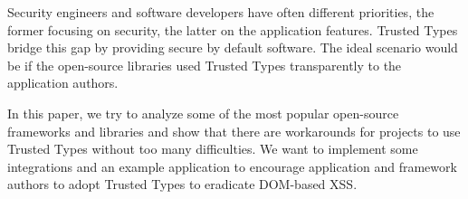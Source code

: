 Security engineers and software developers have often different priorities, the former focusing on
security, the latter on the application features. Trusted Types bridge this gap by providing secure
by default software. The ideal scenario would be if the open-source libraries used Trusted Types
transparently to the application authors.

In this paper, we try to analyze some of the most popular open-source frameworks and libraries and
show that there are workarounds for projects to use Trusted Types without too many difficulties. We
want to implement some integrations and an example application to encourage application and
framework authors to adopt Trusted Types to eradicate DOM-based XSS.
